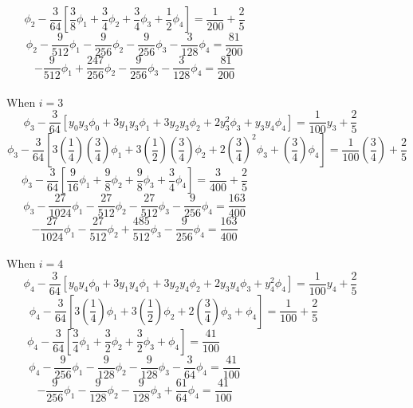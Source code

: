 \documentclass[a4paper,12pt]{report}
\begin{document}
	$$
		\phi_2 - \frac{3}{64} \left[\frac{3}{8}\phi_1 + \frac{3}{4}\phi_2 + \frac{3}{4}\phi_3 + \frac{1}{2}\phi_4\right] = \frac{1}{200} + \frac{2}{5}\qquad\qquad\qquad\qquad\qquad\qquad\quad
	$$
	$$
		\phi_2 - \frac{9}{512}\phi_1 - \frac{9}{256}\phi_2 - \frac{9}{256}\phi_3 - \frac{3}{128}\phi_4 = \frac{81}{200}\qquad\qquad\qquad\qquad\qquad\qquad\quad
	$$
	\begin{equation}
		-\frac{9}{512}\phi_1 + \frac{247}{256}\phi_2 - \frac{9}{256}\phi_3 - \frac{3}{128}\phi_4 = \frac{81}{200}\qquad\qquad\qquad\qquad\qquad\qquad\quad \tag{iii}
	\end{equation}
	\\When $i=3$
	$$
		\phi_3 - \frac{3}{64} \left[y_0y_3\phi_0 + 3y_1y_3\phi_1 + 3y_2y_3\phi_2 + 2y_3^2\phi_3+y_3y_4\phi_4\right] = \frac{1}{100}y_3 + \frac{2}{5}\qquad\quad
	$$
	$$
		\phi_3 - \frac{3}{64} \left[3\left(\frac{1}{4}\right)\left(\frac{3}{4}\right)\phi_1 + 3\left(\frac{1}{2}\right)\left(\frac{3}{4}\right)\phi_2 + 2\left(\frac{3}{4}\right)^2\phi_3 + \left(\frac{3}{4}\right)\phi_4\right] = \frac{1}{100}\left(\frac{3}{4}\right) + \frac{2}{5}
	$$
	$$
		\phi_3 - \frac{3}{64} \left[\frac{9}{16}\phi_1 + \frac{9}{8}\phi_2 + \frac{9}{8}\phi_3 + \frac{3}{4}\phi_4\right] = \frac{3}{400} + \frac{2}{5}\qquad\qquad\qquad\qquad\qquad\qquad\quad
	$$
	$$
		\phi_3 - \frac{27}{1024}\phi_1 - \frac{27}{512}\phi_2 - \frac{27}{512}\phi_3 - \frac{9}{256}\phi_4 = \frac{163}{400}\qquad\qquad\qquad\qquad\qquad\qquad\quad
	$$
	\begin{equation}
		-\frac{27}{1024}\phi_1 - \frac{27}{512}\phi_2 + \frac{485}{512}\phi_3 - \frac{9}{256}\phi_4 = \frac{163}{400}\qquad\qquad\qquad\qquad\qquad\qquad\quad \tag{iv}
	\end{equation}
	\\When $i=4$
	$$
		\phi_4 - \frac{3}{64} \left[y_0y_4\phi_0 + 3y_1y_4\phi_1 + 3y_2y_4\phi_2 + 2y_3y_4\phi_3+y_4^2\phi_4\right] = \frac{1}{100}y_4 + \frac{2}{5}\qquad\quad
	$$
	$$
		\phi_4 - \frac{3}{64} \left[3\left(\frac{1}{4}\right)\phi_1 + 3\left(\frac{1}{2}\right)\phi_2 + 2\left(\frac{3}{4}\right)\phi_3 + \phi_4\right] = \frac{1}{100} + \frac{2}{5}\qquad\qquad\qquad
	$$
	$$
		\phi_4 - \frac{3}{64} \left[\frac{3}{4}\phi_1 + \frac{3}{2}\phi_2 + \frac{3}{2}\phi_3 + \phi_4\right] = \frac{41}{100}\qquad\qquad\qquad\qquad\qquad\qquad\qquad\quad
	$$
	$$
		\phi_4 - \frac{9}{256}\phi_1 - \frac{9}{128}\phi_2 - \frac{9}{128}\phi_3 - \frac{3}{64}\phi_4 = \frac{41}{100}\qquad\qquad\qquad\qquad\qquad\qquad\quad
	$$
	\begin{equation}
		-\frac{9}{256}\phi_1 - \frac{9}{128}\phi_2 - \frac{9}{128}\phi_3 + \frac{61}{64}\phi_4 = \frac{41}{100}\qquad\qquad\qquad\qquad\qquad\qquad\quad \tag{v}
	\end{equation}
\end{document}
